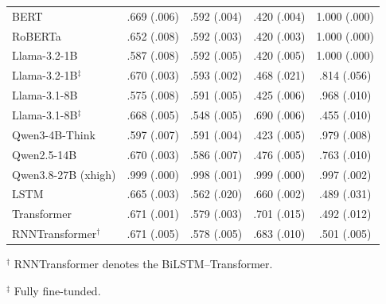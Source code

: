 \documentclass{article} %
\theoremstyle{plain}
\theoremstyle{definition}
\theoremstyle{remark}
\begin{document}
\begin{table}[h!]
\begin{tabular}{@{}lcccc@{}}
BERT & .669 (.006) & .592 (.004) & .420 (.004) & 1.000 (.000) \\
RoBERTa & .652 (.008) & .592 (.003) & .420 (.003) & 1.000 (.000) \\
Llama-3.2-1B & .587 (.008) & .592 (.005) & .420 (.005) & 1.000 (.000) \\
Llama-3.2-1B$^{\ddagger}$ & .670 (.003) & .593 (.002) & .468 (.021) & .814 (.056) \\
Llama-3.1-8B & .575 (.008) & .591 (.005) & .425 (.006) & .968 (.010) \\
Llama-3.1-8B$^{\ddagger}$ & .668 (.005) & .548 (.005) & .690 (.006) & .455 (.010) \\
Qwen3-4B-Think & .597 (.007) & .591 (.004) & .423 (.005) & .979 (.008) \\
Qwen2.5-14B & .670 (.003) & .586 (.007) & .476 (.005) & .763 (.010) \\
Qwen3.8-27B (xhigh) & .999 (.000) & .998 (.001) & .999 (.000) & .997 (.002) \\
LSTM & .665 (.003) & .562 (.020) & .660 (.002) & .489 (.031) \\
Transformer & .671 (.001) & .579 (.003) & .701 (.015) & .492 (.012) \\
RNNTransformer$^{\dagger}$ & .671 (.005) & .578 (.005) & .683 (.010) & .501 (.005) \\
\bottomrule
\end{tabular}
\par\smallskip
\begin{minipage}{\linewidth}
\footnotesize\raggedright
$^{\dagger}$ RNNTransformer denotes the BiLSTM--Transformer.\par
$^{\ddag}$ Fully fine-tunded.
\end{minipage}
\end{table}
\end{document}
